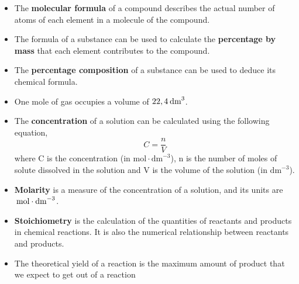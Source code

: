 \begin{itemize}[noitemsep]
\label{m38712*uid114}\item The \textbf{molecular formula} of a compound describes the actual number of atoms of each element in a molecule of the compound.
\label{m38712*uid115}\item The formula of a substance can be used to calculate the \textbf{percentage by mass} that each element contributes to the compound.
\label{m38712*uid116}\item The \textbf{percentage composition} of a substance can be used to deduce its chemical formula.
\label{m38712*uid117}\item One mole of gas occupies a volume of $22,4\phantom{\rule{2pt}{0ex}}{\mathrm{dm}}^{3}$.
\label{m38712*uid118}\item The \textbf{concentration} of a solution can be calculated using the following equation,
\label{m38712*id286019}\nopagebreak\noindent{}
    \begin{equation}
    C=\frac{n}{V}\tag{18.54}
      \end{equation}
where C is the concentration (in $\mathrm{mol}\ensuremath{\cdot}{\mathrm{dm}}^{-3}$), n is the number of moles of solute dissolved in the solution and V is the volume of the solution (in ${\mathrm{dm}}^{-3}$).
\label{m38712*uid119}\item \textbf{Molarity} is a measure of the concentration of a solution, and its units are $\phantom{\rule{2pt}{0ex}}\mathrm{mol}\ensuremath{\cdot}{\mathrm{dm}}^{-3}$.
\label{m38712*uid120}\item \textbf{Stoichiometry} is the calculation of the quantities of reactants and products in chemical reactions. It is also the numerical relationship between reactants and products.
\item The theoretical yield of a reaction is the maximum amount of product that we expect to get out of a reaction\end{itemize}
\label{m38712*secfhsst!!!underscore!!!id2334}
